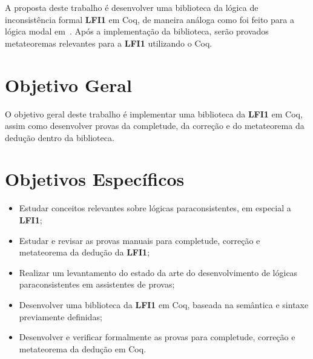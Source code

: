 A proposta deste trabalho é desenvolver uma biblioteca da lógica de inconsistência formal \textbf{LFI1} em Coq, de maneira análoga como foi feito para a lógica modal em~\cite{silveira2020implementacao}. Após a implementação da biblioteca, serão provados metateoremas relevantes para a \textbf{LFI1} utilizando o Coq.



    \section{Objetivo Geral}
    O objetivo geral deste trabalho é implementar uma biblioteca da \textbf{LFI1} em Coq, assim como desenvolver provas da completude, da correção e do metateorema da dedução dentro da biblioteca.


    \section{Objetivos Específicos}
    \begin{itemize}
        \item Estudar conceitos relevantes sobre lógicas paraconsistentes, em especial a \textbf{LFI1};
        \item Estudar e revisar as provas manuais para completude, correção e metateorema da dedução da \textbf{LFI1};
        \item Realizar um levantamento do estado da arte do desenvolvimento de lógicas paraconsistentes em assistentes de provas;
        \item Desenvolver uma biblioteca da \textbf{LFI1} em Coq, baseada na semântica e sintaxe previamente definidas;
        \item Desenvolver e verificar formalmente as provas para completude, correção e metateorema da dedução em Coq.
    \end{itemize}


